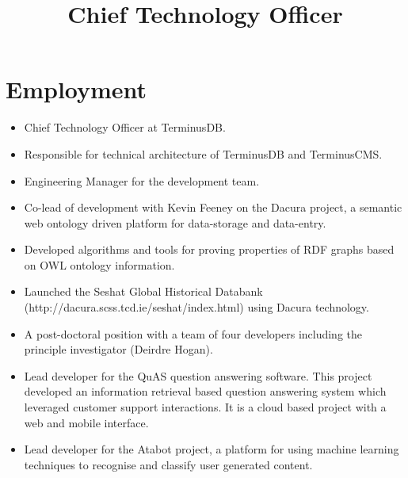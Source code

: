 \documentclass[a4paper,11pt]{moderncv}
\title{Chief Technology Officer}
\begin{document}
\maketitle

\section{Employment}

{
  \begin{itemize}
  \item Chief Technology Officer at TerminusDB.
  \item Responsible for technical architecture of TerminusDB and TerminusCMS.
  \item Engineering Manager for the development team.
  \end{itemize}
}

{
  \begin{itemize}
  \item Co-lead of development with Kevin Feeney on the Dacura project, a semantic web ontology driven platform for data-storage and data-entry.
  \item Developed algorithms and tools for proving properties of RDF graphs based on OWL ontology information.
  \item Launched the Seshat Global Historical Databank (http://dacura.scss.tcd.ie/seshat/index.html) using Dacura technology.
  \end{itemize}
}

{
  \begin{itemize}
  \item A post-doctoral position with a team of four developers including the principle investigator (Deirdre Hogan).
  \item Lead developer for the QuAS question answering software. This project developed an information retrieval based question answering system which leveraged customer support interactions. It is a cloud based project with a web and mobile interface.
  \item Lead developer for the Atabot project, a platform for using machine learning techniques to recognise and classify user generated content.
  \end{itemize}
}
\end{document}
